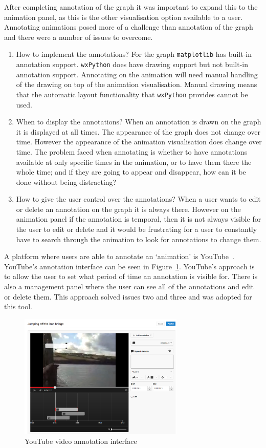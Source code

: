 After completing annotation of the graph it was important to expand this to the animation panel, as this is the other visualisation option available to a user.  Annotating animations posed more of a challenge than annotation of the graph and there were a number of issues to overcome.

\begin{enumerate}
\item How to implement the annotations?  For the graph \texttt{matplotlib} has built-in annotation support.  \texttt{wxPython} does have drawing support but not built-in annotation support.  Annotating on the animation will need manual handling of the drawing on top of the animation visualisation.  Manual drawing means that the automatic layout functionality that \texttt{wxPython} provides cannot be used.
\item When to display the annotations?  When an annotation is drawn on the graph it is displayed at all times.  The appearance of the graph does not change over time.  However the appearance of the animation visualisation does change over time.  The problem faced when annotating is whether to have annotations available at only specific times in the animation, or to have them there the whole time; and if they are going to appear and disappear, how can it be done without being distracting?
\item How to give the user control over the annotations? When a user wants to edit or delete an annotation on the graph it is always there.  However on the animation panel if the annotation is temporal, then it is not always visible for the user to edit or delete and it would be frustrating for a user to constantly have to search through the animation to look for annotations to change them.
\end{enumerate}

A platform where users are able to annotate an `animation' is YouTube~\cite{youtube}.  YouTube's annotation interface can be seen in Figure~\ref{fig:youtube}.  YouTube's approach is to allow the user to set what period of time an annotation is visible for.  There is also a management panel where the user can see all of the annotations and edit or delete them.  This approach solved issues two and three and was adopted for this tool.

\begin{figure}[h!]
    \centering
    \includegraphics[width=0.7\textwidth]{images/youtube.png}
    \caption{YouTube video annotation interface}
    \label{fig:youtube}
\end{figure}

